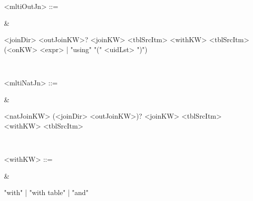 {\noindent\parbox[t]{0.3\linewidth}{
    <mltiOutJn> ::=
    } 
& \noindent\parbox[t]{0.6\linewidth}{
    <joinDir> <outJoinKW>? <joinKW> <tblSrcItm> <withKW> <tblSrcItm> (<onKW> <expr> | "using" "(" <uidLst> ")")
    } \\

\noindent\parbox[t]{0.3\linewidth}{
    <mltiNatJn> ::=
    } 
& \noindent\parbox[t]{0.6\linewidth}{
    <natJoinKW> (<joinDir> <outJoinKW>)? <joinKW> <tblSrcItm> <withKW> <tblSrcItm> 
    } \\

\noindent\parbox[t]{0.3\linewidth}{
    <withKW> ::=
    } 
& \noindent\parbox[t]{0.6\linewidth}{
    "with" | "with table" | "and"
    } \\

}
\newcommand{\selectExpressionTable} {
    \noindent
    \begin{tabularx}{\linewidth}{l l}
        \hline
        \selectExpression
        \hline
    \end{tabularx}
}
\newcommand{\selectExpression} {
\noindent\parbox[t]{0.3\linewidth}{
<selExpr> ::=
} 
& \noindent\parbox[t]{0.6\linewidth}{
    <selKW> <selSpec>* <selElmts> \\
    | <selKW> <nothingElmt>
    } \\

\noindent\parbox[t]{0.3\linewidth}{
<selKW> ::=
} 
& \noindent\parbox[t]{0.6\linewidth}{
    "select" | "find" | "retrieve" | "get" | "show me" | "display" | "present" | "what is" | "what is the" | "what are" | "what are the"
    } \\

\noindent\parbox[t]{0.3\linewidth}{<selSpec> ::=} 
& \noindent\parbox[t]{0.6\linewidth}{
    "all" | "distinct" | "distinctrow
} \\

\noindent\parbox[t]{0.3\linewidth}{<selElmts> ::=} 
& \noindent\parbox[t]{0.6\linewidth}{
    ("*" | <selElmt>) (<delim> <selElmt>)*
} \\

\noindent\parbox[t]{0.3\linewidth}{<delim> ::=} 
& \noindent\parbox[t]{0.6\linewidth}{
    "," | "and"
} \\

\noindent\parbox[t]{0.3\linewidth}{<selElmt> ::=} 
& \noindent\parbox[t]{0.6\linewidth}{
    \emph{"*"} | <colName> | <funCall>
} \\

\noindent\parbox[t]{0.3\linewidth}{<nothingElmt> ::=} 
& \noindent\parbox[t]{0.6\linewidth}{
    <nothingKW>
} \\

\noindent\parbox[t]{0.3\linewidth}{<nothingKW> ::=} 
& \noindent\parbox[t]{0.6\linewidth}{
    "nothing"
} \\

}
